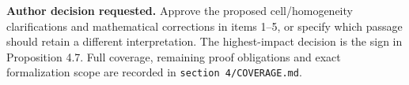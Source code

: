 \documentclass[11pt]{article}
\begin{document}
\medskip\noindent\textbf{Author decision requested.} Approve the proposed
cell/homogeneity clarifications and mathematical corrections in items
1--5, or specify which passage should retain a different interpretation.
The highest-impact decision is the sign in Proposition 4.7. Full coverage,
remaining proof obligations and exact formalization scope are recorded in
\texttt{section 4/COVERAGE.md}.
\end{document}
